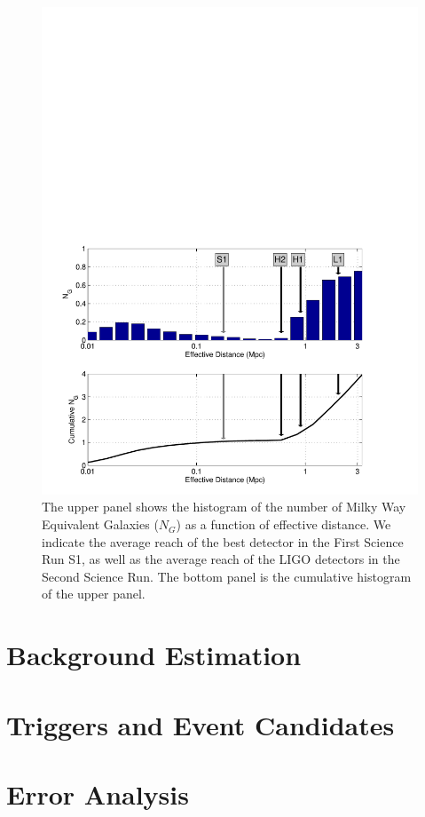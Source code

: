 \begin{figure}
\caption{\label{f:population} The upper panel shows the histogram of
the number of Milky Way Equivalent Galaxies ($N_G$) as a function of
effective distance. We indicate the average reach of the best detector
in the First Science Run S1, as well as the average reach of the LIGO
detectors in the Second Science Run. The bottom panel is the
cumulative histogram of the upper panel.}
\includegraphics[width=\linewidth]{figures/bns/population}
\end{figure}

\section{Background Estimation}

\section{Triggers and Event Candidates}

\section{Error Analysis}

